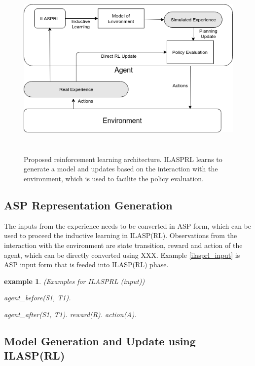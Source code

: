 \documentclass[12pt,twoside]{report}
\newtheorem{examp}{example}[section]
\begin{document}
\begin{figure}[!htb]
\centering
\includegraphics[width=15cm, height=9cm]{./figures/ILASRL}
\caption{Proposed reinforcement learning architecture. ILASPRL learns to generate a model and updates based on the interaction with the environment, which is used to facilite the policy evaluation. }
\label{proposed_architecture}
\end{figure}


\subsection{ASP Representation Generation}

The inputs from the experience needs to be converted in ASP form, which can be used to proceed the inductive learning in ILASP(RL).
Observations from the interaction with the environment are state transition, reward and action of the agent, which can be directly converted using XXX. Example \ref{ilasprl_input} is ASP input form that is feeded into ILASP(RL) phase.

\begin{examp} (Examples for ILASPRL (input))

agent\_before(S1, T1).

agent\_after(S1, T1).
reward(R).
action(A).

\end{examp}
\label{ilasprl_input}

\subsection{Model Generation and Update using ILASP(RL)}
\end{document}
